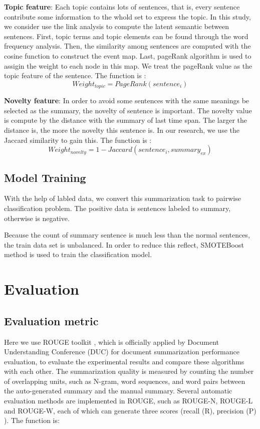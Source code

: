 \documentclass{llncs}
\begin{document}
\textbf{Topic feature}: Each topic contains lots of sentences, that is, every sentence contribute some information to the whold set to express the topic. In this study, we consider use the link analysis to compute the latent semantic between sentences. First, topic terms and topic elements can be found through the word frequency analysis. Then, the similarity among sentences are computed with the cosine function to construct the event map. Last, pageRank algorithm is used to assigin the weight to each node in this map. We treat the pageRank value as the topic feature of the sentence. The function is :
\begin{equation}
Weight_{topic} = PageRank(sentence_i)
\end{equation}

\textbf{Novelty feature}: In order to avoid some sentences with the same meanings be selected as the summary, the novelty of sentence is important. The novelty value is compute by the distance with the summary of last time span. The larger the distance is, the more the novelty this sentence is. In our research, we use the Jaccard similarity to gain this. The function is :
\begin{equation}
Weight_{novelty} = 1 - Jaccard(sentence_i, summary_{ex})
\end{equation}


\subsection{Model Training}

With the help of labled data, we convert this summarization task to pairwise classification problem. The positive data is sentences labeled to summary, otherwise is negative. 

Because the count of summary sentence is much less than the normal sentences, the train data set is unbalanced. In order to reduce this reflect, SMOTEBoost method is used to train the classification model.

%
\section{Evaluation}
%

\subsection{Evaluation metric}

Here we use ROUGE toolkit \cite{2004-Lin-p74-81} , which is officially applied by Document Understanding Conference (DUC) for document summarization performance evaluation, to evaluate the experimental results and compare these algorithms with each other. The summarization quality is measured by counting the number of overlapping units, such as N-gram, word sequences, and word pairs between the auto-generated summary and the manual summary. Several automatic evaluation methods are implemented in ROUGE, such as ROUGE-N, ROUGE-L and ROUGE-W, each of which can generate three scores (recall (R), precision (P) %
). The function is:
\end{document}
